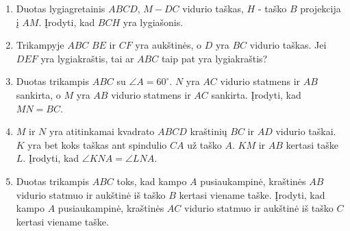 \begin{enumerate}
\item Duotas lygiagretainis $ABCD$, $M-DC$ vidurio taškas, $H$ - taško $B$
  projekcija į $AM$. Įrodyti, kad $BCH$ yra lygiašonis.
\item Trikampyje $ABC$ $BE$ ir $CF$ yra aukštinės, o $D$ yra $BC$ vidurio
  taškas. Jei $DEF$ yra lygiakraštis, tai ar $ABC$ taip pat yra
  lygiakraštis?
\item Duotas trikampis $ABC$ su $\angle A = 60^\circ$. $N$ yra $AC$ vidurio
  statmens ir $AB$ sankirta, o $M$ yra $AB$ vidurio statmens ir $AC$
  sankirta. Įrodyti, kad $MN = BC$.
\item $M$ ir $N$ yra atitinkamai kvadrato $ABCD$ kraštinių $BC$ ir $AD$
  vidurio taškai. $K$ yra bet koks taškas ant spindulio $CA$ už taško $A$.
  $KM$ ir $AB$ kertasi taške $L$. Įrodyti, kad $\angle KNA = \angle LNA$.
\item Duotas trikampis $ABC$ toks, kad kampo $A$ pusiaukampinė, kraštinės
  $AB$ vidurio statmuo ir aukštinė iš taško $B$ kertasi viename taške.
  Įrodyti, kad kampo $A$ pusiaukampinė, kraštinės $AC$ vidurio statmuo ir
  aukštinė iš taško $C$ kertasi viename taške.

\end{enumerate}
